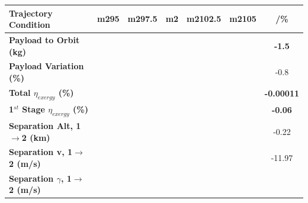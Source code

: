 \begin{table}[ht]
	\centering
	
	
\begin{tabular}{l c c c c c c} 
	\hline \textbf{Trajectory Condition}
	&m295
	&m297.5
	&m2
	&m2102.5
	&m2105
	& /\%
	\\
	\hline \textbf{Payload to Orbit (kg)}
	& \textbf{\PayloadToOrbitmSPARTANNinetyFiveNoReturn}
	& \textbf{\PayloadToOrbitmSPARTANNinetySevenFiveNoReturn}
	& \textbf{\PayloadToOrbitmSPARTANStandardNoReturn}
	& \textbf{\PayloadToOrbitmSPARTANOneHundredTwoFiveNoReturn}
	& \textbf{\PayloadToOrbitmSPARTANOneHundredFiveNoReturn}
	&\textbf{-1.5}
	\\
	\textbf{Payload Variation (\%)}
	& \PayloadVarmSPARTANNinetyFiveNoReturn
	& \PayloadVarmSPARTANNinetySevenFiveNoReturn
	& \PayloadVarmSPARTANStandardNoReturn
	& \PayloadVarmSPARTANOneHundredTwoFiveNoReturn
	& \PayloadVarmSPARTANOneHundredFiveNoReturn
	&-0.8
	\\
	\textbf{Total $\eta_{exergy}$ (\%)}
	& \textbf{\totalExergyEffmSPARTANNinetyFiveNoReturn}
	& \textbf{\totalExergyEffmSPARTANNinetySevenFiveNoReturn}
	& \textbf{\totalExergyEffmSPARTANStandardNoReturn}
	& \textbf{\totalExergyEffmSPARTANOneHundredTwoFiveNoReturn}
	& \textbf{\totalExergyEffmSPARTANOneHundredFiveNoReturn}
	& \textbf{-0.00011}
	\\
	\hline 
	\textbf{1$^{st}$ Stage $\eta_{exergy}$ (\%)}
	& \textbf{\firstExergyEffmSPARTANNinetyFiveNoReturn}
	& \textbf{\firstExergyEffmSPARTANNinetySevenFiveNoReturn}
	& \textbf{\firstExergyEffmSPARTANStandardNoReturn}
	& \textbf{\firstExergyEffmSPARTANOneHundredTwoFiveNoReturn}
	& \textbf{\firstExergyEffmSPARTANOneHundredFiveNoReturn}
	& \textbf{-0.06}
	\\
	\textbf{Separation Alt, 1$\rightarrow$2 (km)}
	& \firstsecondSeparationAltmSPARTANNinetyFiveNoReturn
	& \firstsecondSeparationAltmSPARTANNinetySevenFiveNoReturn
	& \firstsecondSeparationAltmSPARTANStandardNoReturn
	& \firstsecondSeparationAltmSPARTANOneHundredTwoFiveNoReturn
	& \firstsecondSeparationAltmSPARTANOneHundredFiveNoReturn
	&-0.22
	\\
	\textbf{Separation v, 1$\rightarrow$2 (m/s)}
	& \firstsecondSeparationvmSPARTANNinetyFiveNoReturn
	& \firstsecondSeparationvmSPARTANNinetySevenFiveNoReturn
	& \firstsecondSeparationvmSPARTANStandardNoReturn
	& \firstsecondSeparationvmSPARTANOneHundredTwoFiveNoReturn
	& \firstsecondSeparationvmSPARTANOneHundredFiveNoReturn
	&-11.97
	\\
	\textbf{Separation $\gamma$, 1$\rightarrow$2 (m/s)}

\end{tabular}
\end{table}
